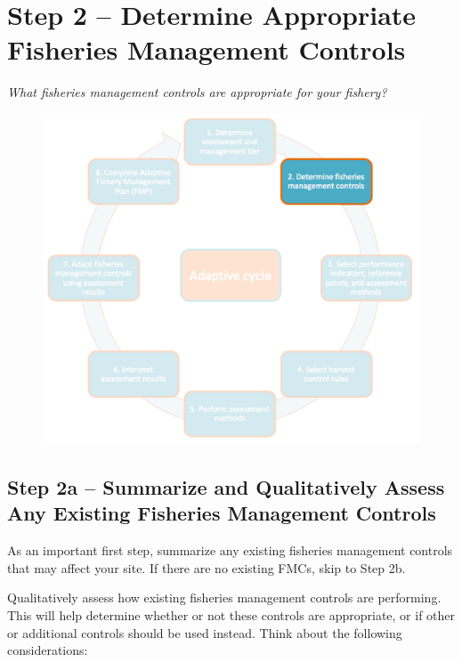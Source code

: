 \documentclass[]{book}
\begin{document}
\chapter{Step 2 -- Determine Appropriate Fisheries Management
Controls}\label{Step2}

\emph{What fisheries management controls are appropriate for your
fishery?}

\begin{figure}
\centering
\includegraphics{myMediaFolder/media/Step2.png}
\caption{}
\end{figure}

\section{Step 2a -- Summarize and Qualitatively Assess Any Existing
Fisheries Management
Controls}\label{step-2a-summarize-and-qualitatively-assess-any-existing-fisheries-management-controls}

As an important first step, summarize any existing fisheries management
controls that may affect your site. If there are no existing FMCs, skip
to Step 2b.

Qualitatively assess how existing fisheries management controls are
performing. This will help determine whether or not these controls are
appropriate, or if other or additional controls should be used instead.
Think about the following considerations:
\end{document}
